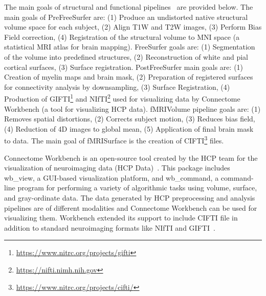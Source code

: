 The main goals of structural and functional pipelines~\cite{Gla13} are provided below. The main goals of PreFreeSurfer are: (1) Produce an undistorted native structural volume space for each subject, (2) Align T1W and T2W images, (3) Perform Bias Field correction, (4) Registration of the structural volume to MNI space (a statistical MRI atlas for brain mapping). FreeSurfer goals are: (1) Segmentation of the volume into predefined structures, (2) Reconstruction of white and pial cortical surfaces, (3) Surface registration. PostFreeSurfer main goals are: (1) Creation of myelin maps and brain mask, (2) Preparation of registered surfaces for connectivity analysis by downsampling, (3) Surface Registration, (4) Production of GIFTI\footnote{\url{https://www.nitrc.org/projects/gifti}} and NIfTI\footnote{\url{https://nifti.nimh.nih.gov}} used for visualizing data by Connectome Workbench (a tool for visualizing HCP data). fMRIVolume pipeline goals are: (1) Removes spatial distortions, (2) Corrects subject motion, (3) Reduces bias field, (4) Reduction of 4D images to global mean, (5) Application of final brain mask to data. The main goal of fMRISurface is the creation of CIFTI\footnote{\url{https://www.nitrc.org/projects/cifti/}} files.

Connectome Workbench is an open-source tool created by the HCP team for the visualization of neuroimaging data (HCP Data)~\cite{wb_workbench}. This package includes wb\_view, a GUI-based visualization platform, and wb\_command, a command-line program for performing a variety of algorithmic tasks using volume, surface, and gray-ordinate data. The data generated by HCP preprocessing and analysis pipelines are of different modalities and Connectome Workbench can be used for visualizing them. Workbench extended its support to include CIFTI file in addition to standard neuroimaging formats like NIfTI and GIFTI~\cite{journals/neuroimage/MarcusHSJWGBABRHHHOMHHRHCSECE13}.
 

